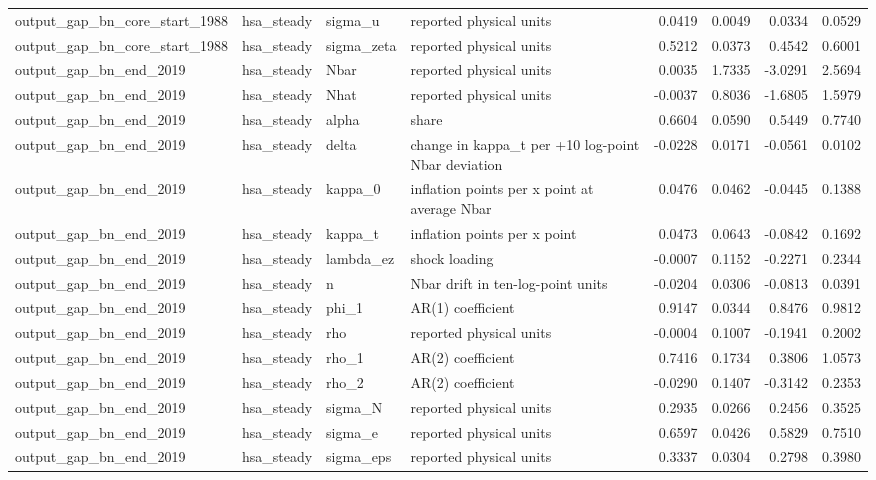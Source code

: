 \begin{tabular}{llllrrrr}
output\_gap\_bn\_core\_start\_1988 & hsa\_steady & sigma\_u & reported physical units & 0.0419 & 0.0049 & 0.0334 & 0.0529 \\
output\_gap\_bn\_core\_start\_1988 & hsa\_steady & sigma\_zeta & reported physical units & 0.5212 & 0.0373 & 0.4542 & 0.6001 \\
output\_gap\_bn\_end\_2019 & hsa\_steady & Nbar & reported physical units & 0.0035 & 1.7335 & -3.0291 & 2.5694 \\
output\_gap\_bn\_end\_2019 & hsa\_steady & Nhat & reported physical units & -0.0037 & 0.8036 & -1.6805 & 1.5979 \\
output\_gap\_bn\_end\_2019 & hsa\_steady & alpha & share & 0.6604 & 0.0590 & 0.5449 & 0.7740 \\
output\_gap\_bn\_end\_2019 & hsa\_steady & delta & change in kappa\_t per +10 log-point Nbar deviation & -0.0228 & 0.0171 & -0.0561 & 0.0102 \\
output\_gap\_bn\_end\_2019 & hsa\_steady & kappa\_0 & inflation points per x point at average Nbar & 0.0476 & 0.0462 & -0.0445 & 0.1388 \\
output\_gap\_bn\_end\_2019 & hsa\_steady & kappa\_t & inflation points per x point & 0.0473 & 0.0643 & -0.0842 & 0.1692 \\
output\_gap\_bn\_end\_2019 & hsa\_steady & lambda\_ez & shock loading & -0.0007 & 0.1152 & -0.2271 & 0.2344 \\
output\_gap\_bn\_end\_2019 & hsa\_steady & n & Nbar drift in ten-log-point units & -0.0204 & 0.0306 & -0.0813 & 0.0391 \\
output\_gap\_bn\_end\_2019 & hsa\_steady & phi\_1 & AR(1) coefficient & 0.9147 & 0.0344 & 0.8476 & 0.9812 \\
output\_gap\_bn\_end\_2019 & hsa\_steady & rho & reported physical units & -0.0004 & 0.1007 & -0.1941 & 0.2002 \\
output\_gap\_bn\_end\_2019 & hsa\_steady & rho\_1 & AR(2) coefficient & 0.7416 & 0.1734 & 0.3806 & 1.0573 \\
output\_gap\_bn\_end\_2019 & hsa\_steady & rho\_2 & AR(2) coefficient & -0.0290 & 0.1407 & -0.3142 & 0.2353 \\
output\_gap\_bn\_end\_2019 & hsa\_steady & sigma\_N & reported physical units & 0.2935 & 0.0266 & 0.2456 & 0.3525 \\
output\_gap\_bn\_end\_2019 & hsa\_steady & sigma\_e & reported physical units & 0.6597 & 0.0426 & 0.5829 & 0.7510 \\
output\_gap\_bn\_end\_2019 & hsa\_steady & sigma\_eps & reported physical units & 0.3337 & 0.0304 & 0.2798 & 0.3980 \\

\end{tabular}
